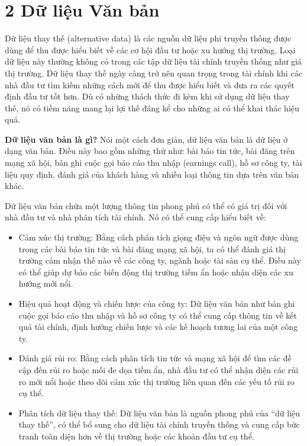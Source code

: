\section{2 Dữ liệu Văn bản}

Dữ liệu thay thế (alternative data) là các nguồn dữ liệu phi truyền thống được dùng để thu được hiểu biết về các cơ hội đầu tư hoặc xu hướng thị trường. Loại dữ liệu này thường không có trong các tập dữ liệu tài chính truyền thống như giá thị trường. Dữ liệu thay thế ngày càng trở nên quan trọng trong tài chính khi các nhà đầu tư tìm kiếm những cách mới để thu được hiểu biết và đưa ra các quyết định đầu tư tốt hơn. Dù có những thách thức đi kèm khi sử dụng dữ liệu thay thế, nó có tiềm năng mang lại lợi thế đáng kể cho những ai có thể khai thác hiệu quả.

\textbf{Dữ liệu văn bản là gì?} Nói một cách đơn giản, dữ liệu văn bản là dữ liệu ở dạng văn bản. Điều này bao gồm những thứ như: bài báo tin tức, bài đăng trên mạng xã hội, bản ghi cuộc gọi báo cáo thu nhập (earnings call), hồ sơ công ty, tài liệu quy định, đánh giá của khách hàng và nhiều loại thông tin dựa trên văn bản khác.

Dữ liệu văn bản chứa một lượng thông tin phong phú có thể có giá trị đối với nhà đầu tư và nhà phân tích tài chính. Nó có thể cung cấp hiểu biết về:

\begin{itemize}
  \item Cảm xúc thị trường: Bằng cách phân tích giọng điệu và ngôn ngữ được dùng trong các bài báo tin tức và bài đăng mạng xã hội, ta có thể đánh giá thị trường cảm nhận thế nào về các công ty, ngành hoặc tài sản cụ thể. Điều này có thể giúp dự báo các biến động thị trường tiềm ẩn hoặc nhận diện các xu hướng mới nổi.
  \item Hiệu quả hoạt động và chiến lược của công ty: Dữ liệu văn bản như bản ghi cuộc gọi báo cáo thu nhập và hồ sơ công ty có thể cung cấp thông tin về kết quả tài chính, định hướng chiến lược và các kế hoạch tương lai của một công ty.
  \item Đánh giá rủi ro: Bằng cách phân tích tin tức và mạng xã hội để tìm các đề cập đến rủi ro hoặc mối đe dọa tiềm ẩn, nhà đầu tư có thể nhận diện các rủi ro mới nổi hoặc theo dõi cảm xúc thị trường liên quan đến các yếu tố rủi ro cụ thể.
  \item Phân tích dữ liệu thay thế: Dữ liệu văn bản là nguồn phong phú của ``dữ liệu thay thế'', có thể bổ sung cho dữ liệu tài chính truyền thống và cung cấp bức tranh toàn diện hơn về thị trường hoặc các khoản đầu tư cụ thể.
\end{itemize}

